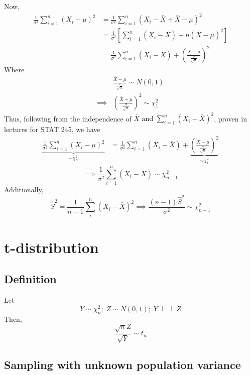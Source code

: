 \documentclass[
]{article}
\begin{document}
Now, \[\begin{aligned}
\frac{1}{\sigma^2}\sum_{i=1}^n (X_i - \mu)^2&= \frac{1}{\sigma^2}\sum_{i=1}^n (X_i - \bar{X} + \bar{X} - \mu)^2 \\
&= \frac{1}{\sigma^2}\left[\sum_{i=1}^n (X_i - \bar{X}) + n(\bar{X} - \mu)^2 \right] \\
&= \frac{1}{\sigma^2}\sum_{i=1}^n (X_i - \bar{X}) + \left(\frac{\bar{X} - \mu}{\frac{\sigma}{\sqrt{n}}}\right)^2  
\end{aligned}\] Where \[\begin{aligned}
&\frac{\bar{X} - \mu}{\frac{\sigma}{\sqrt{n}}} \sim N(0, 1) \\
\implies&\left(\frac{\bar{X} - \mu}{\frac{\sigma}{\sqrt{n}}}\right)^2 \sim \chi ^2 _1
\end{aligned}\] Thus, following from the independence of
\(\bar{X} \text{ and } \sum_{i=1}^n(X_i - \bar{X})^2\), proven in
lectures for STAT 245, we have \[\begin{aligned}
\underbrace{\frac{1}{\sigma^2}\sum_{i=1}^n (X_i - \mu)^2}_{\sim \chi^2_n}
&= \frac{1}{\sigma^2}\sum_{i=1}^n (X_i - \bar{X}) + \underbrace{\left(\frac{\bar{X} - \mu}{\frac{\sigma}{\sqrt{n}}}\right)^2}_{\sim \chi ^2 _1} 
\end{aligned}\]
\boldmath \[\implies \frac{1}{\sigma^2}\sum_{i=1}^n (X_i - \bar{X}) \sim \chi^2_{n-1}\]\unboldmath
Additionally,
\[\hat{S}^2 = \frac{1}{n-1}\sum_i^n(X_i - \bar{X})^2\implies \frac{(n-1)\hat{S}^2}{\sigma^2} \sim \chi ^2 _{n-1}\]

\hypertarget{t-distribution}{%
\section{t-distribution}\label{t-distribution}}

\hypertarget{definition}{%
\subsection{Definition}\label{definition}}

Let \[Y \sim \chi ^2 _n; \; Z \sim N(0, 1); \; Y \perp \!\!\! \perp Z\]
Then, \[\frac{\sqrt{n}Z}{\sqrt{Y}}\sim t_n\]

\hypertarget{sampling-with-unknown-population-variance}{%
\subsection{Sampling with unknown population
variance}\label{sampling-with-unknown-population-variance}}
\end{document}
